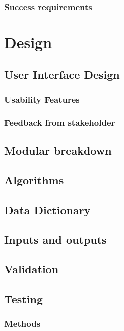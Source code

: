 \documentclass{article}
\begin{document}
\subsubsection{Success requirements}

\section{Design}

\subsection{User Interface Design}

\subsubsection{Usability Features}

\subsubsection{Feedback from stakeholder}

\subsection{Modular breakdown}

\subsection{Algorithms}

\subsection{Data Dictionary}

\subsection{Inputs and outputs}

\subsection{Validation}

\subsection{Testing}

\subsubsection{Methods}
\end{document}
